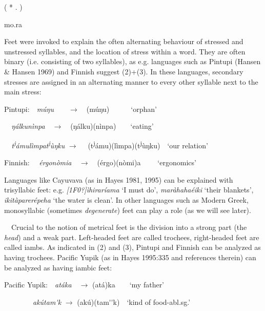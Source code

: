 \documentclass[a4paper]{article}
\begin{document}
\ea *

{
( *  . )}

{
mo.ra}
\z

Feet were invoked to explain the often alternating behaviour of stressed and unstressed syllables, and the location of stress within a word. They are often binary (i.e. consisting of two syllables), as e.g. languages such as Pintupi (Hansen \& Hansen 1969) and Finnish suggest (2)+(3). In these languages, secondary stresses are assigned in an alternating manner to every other syllable next to the main stress:

\ea Pintupi:\ \ \textit{múŋu}\ \ \ \   ${\rightarrow}$\ \ (múŋu)\ \ \ \ \ \ ‘orphan’

{
\textit{\ \ ŋ}\textit{álkunìnpa}\ \   ${\rightarrow}$\ \ (ŋálku)(nìnpa)\ \ \ \ ‘eating’}

{
\textit{\ \ t}\textit{\textsuperscript{j}}\textit{ámulìmpat}\textit{\textsuperscript{j}}\textit{ùŋku  }${\rightarrow}$ \ \ (t\textsuperscript{j}ámu)(lìmpa)(t\textsuperscript{j}ùŋku)\ \ ‘our relation’}
\z

\ea Finnish: \ \ \textit{érgonòmia\ \   }${\rightarrow}$\ \ (érgo)(nòmi)a\textit{\ \ } \ \ ‘ergonomics’ \z

Languages like Cayuvava (as in Hayes 1981, 1995) can be explained with trisyllabic feet: e.g. \textit{[1F0?]ìhiraríama} ‘I must do’, \textit{maràhahaéiki} ‘their blankets’, \textit{ikitàparerépeha }‘the water is clean’. In other languages such as Modern Greek, monosyllabic (sometimes \textit{degenerate}) feet can play a role (as we will see later).

\ \ Crucial to the notion of metrical feet is the division into a strong part (the \textit{head}) and a weak part. Left-headed feet are called trochees, right-headed feet are called iambs. As indicated in (2) and (3), Pintupi and Finnish can be analyzed as having trochees. Pacific Yupik (as in Hayes 1995:335 and references therein) can be analyzed as having iambic feet:

\ea Pacific Yupik:\ \ \textit{atáka}\ \   ${\rightarrow}$ (atá)ka\ \ \ \ ‘my father’

{
\ \ \ \ \ \ \ \ \textit{akútam}\textit{\'{{\textschwa}}}\textit{k}  ${\rightarrow}$ (akú)(tam\'{{\textschwa}}\'{ }k)\ \ ‘kind of food-abl.sg.’}
\z
\end{document}
